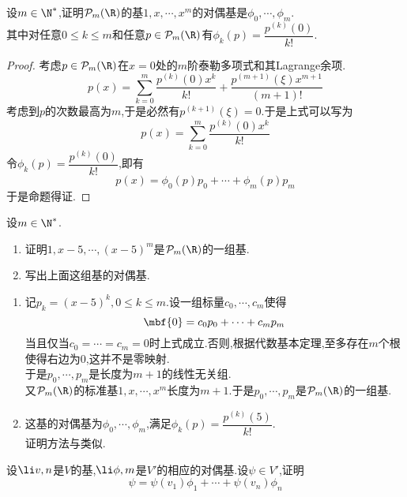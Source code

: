 \documentclass{ctexart}
\begin{document}
\begin{problem}[9.]
    设$m\in\N^*$,证明$\mathcal{P}_m(\R)$的基$1,x,\cdots,x^m$的对偶基是$\phi_0,\cdots,\phi_m$.\\
    其中对任意$0\leqslant k\leqslant m$和任意$p\in\mathcal{P}_m(\R)$有$\phi_k(p)=\dfrac{p^{(k)}(0)}{k!}$.
\end{problem}
\begin{proof}
    考虑$p\in\mathcal{P}_m(\R)$在$x=0$处的$m$阶泰勒多项式和其Lagrange余项.
    $$p(x)=\sum_{k=0}^{m}\dfrac{p^{(k)}(0)x^k}{k!}+\dfrac{p^{(m+1)}(\xi)x^{m+1}}{(m+1)!}$$
    考虑到$p$的次数最高为$m$,于是必然有$p^{(k+1)}(\xi)=0$.于是上式可以写为
    $$p(x)=\sum_{k=0}^{m}\dfrac{p^{(k)}(0)x^k}{k!}$$
    令$\phi_k(p)=\dfrac{p^{(k)}(0)}{k!}$,即有
    $$p(x)=\phi_0(p)p_0+\cdots+\phi_m(p)p_m$$
    于是命题得证.
\end{proof}
\begin{problem}[10.]
    设$m\in\N^*$.
    \begin{enumerate}[label=\tbf{(\arabic*)}]
        \item 证明$1,x-5,\cdots,(x-5)^m$是$\mathcal{P}_m(\R)$的一组基.
        \item 写出上面这组基的对偶基.
    \end{enumerate}
\end{problem}
\begin{solution}[Solution.]
    \begin{enumerate}[label=\tbf{(\arabic*)}]
        \item 记$p_k=(x-5)^k,0\leqslant k\leqslant m$.设一组标量$c_0,\cdots,c_m$使得
            $$\mbf{0}=c_0p_0+\cdots+c_mp_m$$
            当且仅当$c_0=\cdots=c_m=0$时上式成立.否则,根据代数基本定理,至多存在$m$个根使得右边为$0$,这并不是零映射.\\
            于是$p_0,\cdots,p_m$是长度为$m+1$的线性无关组.\\
            又$\mathcal{P}_m(\R)$的标准基$1,x,\cdots,x^m$长度为$m+1$.于是$p_0,\cdots,p_m$是$\mathcal{P}_m(\R)$的一组基.
        \item 这基的对偶基为$\phi_0,\cdots,\phi_m$,满足$\phi_k(p)=\dfrac{p^{(k)}(5)}{k!}$.\\
            证明方法与类似.
    \end{enumerate}
\end{solution}
\begin{problem}[11.]
    设$\li v,n$是$V$的基,$\li\phi,m$是$V'$的相应的对偶基.设$\psi\in V'$,证明
    $$\psi=\psi(v_1)\phi_1+\cdots+\psi(v_n)\phi_n$$
\end{problem}
\end{document}
